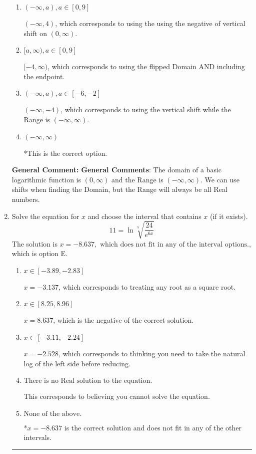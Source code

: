\documentclass{extbook}[14pt]
\newcommand{\litem}[1]{\item #1

\rule{\textwidth}{0.4pt}}
\begin{document}
\begin{enumerate}
{\begin{enumerate}[label=\Alph*.]
$[-4, \infty)$, which corresponds to using the negative of the horizontal shift AND including the endpoint.
\item \( (-\infty, a), a \in [0, 9] \)

$(-\infty, 4)$, which corresponds to using the using the negative of vertical shift on $(0, \infty)$.
\item \( [a, \infty), a \in [0, 9] \)

$[-4, \infty)$, which corresponds to using the flipped Domain AND including the endpoint.
\item \( (-\infty, a), a \in [-6, -2] \)

$(-\infty, -4)$, which corresponds to using the vertical shift while the Range is $(-\infty, \infty)$.
\item \( (-\infty, \infty) \)

*This is the correct option.
\end{enumerate}

\textbf{General Comment:} \textbf{General Comments}: The domain of a basic logarithmic function is $(0, \infty)$ and the Range is $(-\infty, \infty)$. We can use shifts when finding the Domain, but the Range will always be all Real numbers.
}
\litem{
 Solve the equation for $x$ and choose the interval that contains $x$ (if it exists).
\[  11 = \ln{\sqrt[5]{\frac{24}{e^{6x}}}} \]The solution is \( x = -8.637, \text{ which does not fit in any of the interval options.} \), which is option E.\begin{enumerate}[label=\Alph*.]
\item \( x \in [-3.89, -2.83] \)

$x = -3.137$, which corresponds to treating any root as a square root.
\item \( x \in [8.25, 8.96] \)

$x = 8.637$, which is the negative of the correct solution.
\item \( x \in [-3.11, -2.24] \)

$x = -2.528$, which corresponds to thinking you need to take the natural log of the left side before reducing.
\item \( \text{There is no Real solution to the equation.} \)

This corresponds to believing you cannot solve the equation.
\item \( \text{None of the above.} \)

*$x = -8.637$ is the correct solution and does not fit in any of the other intervals.
\end{enumerate}

}
\end{enumerate}
\end{document}
